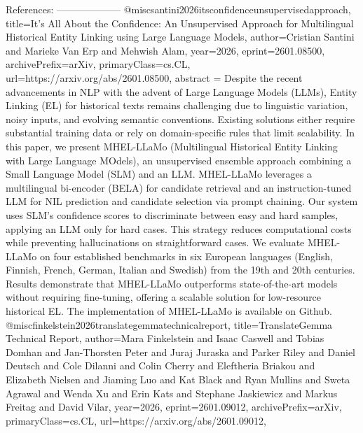         References:
        --------------------
        @misc{santini2026itsconfidenceunsupervisedapproach,
      title={It's All About the Confidence: An Unsupervised Approach for Multilingual Historical Entity Linking using Large Language Models}, 
      author={Cristian Santini and Marieke Van Erp and Mehwish Alam},
      year={2026},
      eprint={2601.08500},
      archivePrefix={arXiv},
      primaryClass={cs.CL},
      url={https://arxiv.org/abs/2601.08500},
      abstract = {Despite the recent advancements in NLP with the advent of Large Language Models (LLMs), Entity Linking (EL) for historical texts remains challenging due to linguistic variation, noisy inputs, and evolving semantic conventions. Existing solutions either require substantial training data or rely on domain-specific rules that limit scalability. In this paper, we present MHEL-LLaMo (Multilingual Historical Entity Linking with Large Language MOdels), an unsupervised ensemble approach combining a Small Language Model (SLM) and an LLM. MHEL-LLaMo leverages a multilingual bi-encoder (BELA) for candidate retrieval and an instruction-tuned LLM for NIL prediction and candidate selection via prompt chaining. Our system uses SLM's confidence scores to discriminate between easy and hard samples, applying an LLM only for hard cases. This strategy reduces computational costs while preventing hallucinations on straightforward cases. We evaluate MHEL-LLaMo on four established benchmarks in six European languages (English, Finnish, French, German, Italian and Swedish) from the 19th and 20th centuries. Results demonstrate that MHEL-LLaMo outperforms state-of-the-art models without requiring fine-tuning, offering a scalable solution for low-resource historical EL. The implementation of MHEL-LLaMo is available on Github.}
}@misc{finkelstein2026translategemmatechnicalreport,
      title={TranslateGemma Technical Report}, 
      author={Mara Finkelstein and Isaac Caswell and Tobias Domhan and Jan-Thorsten Peter and Juraj Juraska and Parker Riley and Daniel Deutsch and Cole Dilanni and Colin Cherry and Eleftheria Briakou and Elizabeth Nielsen and Jiaming Luo and Kat Black and Ryan Mullins and Sweta Agrawal and Wenda Xu and Erin Kats and Stephane Jaskiewicz and Markus Freitag and David Vilar},
      year={2026},
      eprint={2601.09012},
      archivePrefix={arXiv},
      primaryClass={cs.CL},
      url={https://arxiv.org/abs/2601.09012},
}
